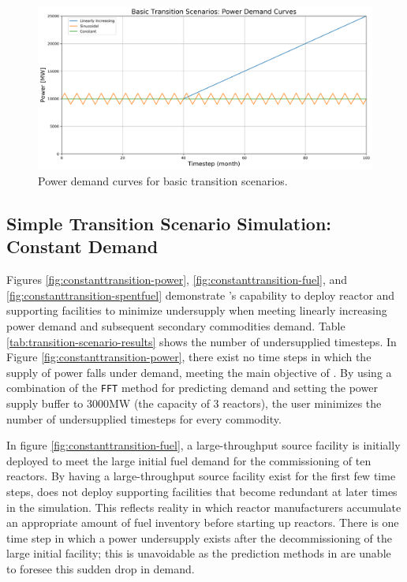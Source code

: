     \begin{figure}[]
        \begin{center}
            \includegraphics[scale=0.5]{./figures/powerplots.png}
        \end{center}
            \caption{Power demand curves for basic transition scenarios.}
        \label{fig:powerplots}
    \end{figure}

\subsection{Simple Transition Scenario Simulation: Constant Demand}
Figures \ref{fig:constanttransition-power}, \ref{fig:constanttransition-fuel},
and \ref{fig:constanttransition-spentfuel} demonstrate \deploy's capability 
to deploy reactor and supporting facilities to minimize undersupply 
when meeting linearly increasing power demand and subsequent secondary 
commodities demand.  
Table \ref{tab:transition-scenario-results} shows the number of 
undersupplied timesteps. 
In Figure \ref{fig:constanttransition-power}, there exist no time steps 
in which the supply of power falls under demand, meeting the main 
objective of \deploy. 
By using a combination of the \texttt{FFT} method for 
predicting demand and setting the power supply buffer to 3000MW 
(the capacity of 3 reactors), the user minimizes the number of 
undersupplied timesteps for every commodity.

In figure \ref{fig:constanttransition-fuel},
a large-throughput source facility is initially
deployed to meet the large initial fuel demand for the commissioning 
of ten reactors. 
By having a large-throughput source facility exist for the 
first few time steps, \deploy does not deploy supporting
facilities that become redundant at later times in  
the simulation.
This reflects reality in which reactor manufacturers accumulate
an appropriate amount of fuel inventory before starting 
up reactors. 
There is one time step in which a power undersupply exists after the 
decommissioning of the large initial facility; 
this is unavoidable as the prediction methods in \deploy are 
unable to foresee this sudden drop in demand. 

